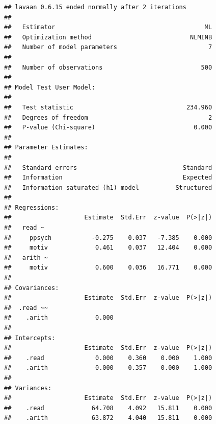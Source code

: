 \documentclass[
]{article}
\begin{document}
\begin{verbatim}
## lavaan 0.6.15 ended normally after 2 iterations
## 
##   Estimator                                         ML
##   Optimization method                           NLMINB
##   Number of model parameters                         7
## 
##   Number of observations                           500
## 
## Model Test User Model:
##                                                       
##   Test statistic                               234.960
##   Degrees of freedom                                 2
##   P-value (Chi-square)                           0.000
## 
## Parameter Estimates:
## 
##   Standard errors                             Standard
##   Information                                 Expected
##   Information saturated (h1) model          Structured
## 
## Regressions:
##                    Estimate  Std.Err  z-value  P(>|z|)
##   read ~                                              
##     ppsych           -0.275    0.037   -7.385    0.000
##     motiv             0.461    0.037   12.404    0.000
##   arith ~                                             
##     motiv             0.600    0.036   16.771    0.000
## 
## Covariances:
##                    Estimate  Std.Err  z-value  P(>|z|)
##  .read ~~                                             
##    .arith             0.000                           
## 
## Intercepts:
##                    Estimate  Std.Err  z-value  P(>|z|)
##    .read              0.000    0.360    0.000    1.000
##    .arith             0.000    0.357    0.000    1.000
## 
## Variances:
##                    Estimate  Std.Err  z-value  P(>|z|)
##    .read             64.708    4.092   15.811    0.000
##    .arith            63.872    4.040   15.811    0.000
\end{verbatim}
\end{document}
